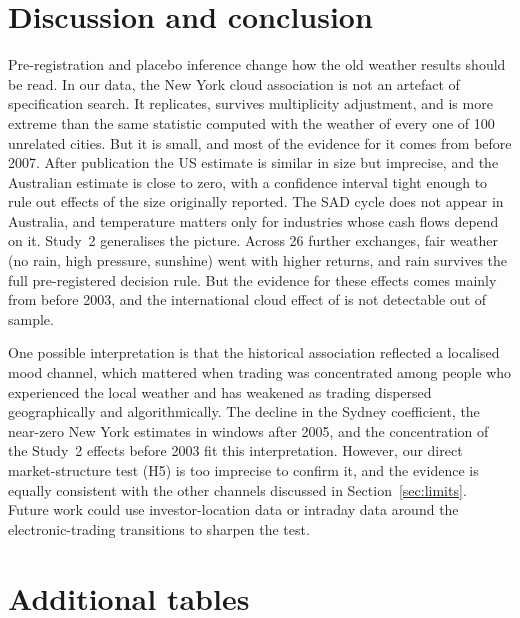 \documentclass[11pt]{article}
\begin{document}
\section{Discussion and conclusion}

Pre-registration and placebo inference change how the old weather results should be read. In our
data, the New York cloud association is not an artefact of specification search. It replicates, survives
multiplicity adjustment, and is more extreme than the same statistic computed with the weather of
every one of 100 unrelated cities. But it is small, and most of the evidence for it comes from
before 2007. After publication the US estimate is similar in size but imprecise, and the
Australian estimate is close to zero, with a confidence interval tight enough to rule out effects
of the size originally reported. The SAD cycle does not appear in Australia, and temperature
matters only for industries whose cash flows depend on it. Study~2 generalises the picture. Across
26 further exchanges, fair weather (no rain, high pressure, sunshine) went with higher returns,
and rain survives the full pre-registered decision rule. But the evidence for these effects comes
mainly from before 2003, and the international cloud effect of \citet{hirshleifer2003} is not
detectable out of sample.

One possible interpretation is that the historical association reflected a localised mood channel,
which mattered when trading was concentrated among people who experienced the local weather and
has weakened as trading dispersed geographically and algorithmically. The decline in the Sydney
coefficient, the near-zero New York estimates in windows after 2005, and the concentration of the
Study~2 effects before 2003 fit this interpretation. However, our direct market-structure test (H5)
is too imprecise to confirm it, and the evidence is equally consistent with the other channels
discussed in Section~\ref{sec:limits}. Future work could use investor-location data
\citep{goetzmann2015} or intraday data around the electronic-trading transitions to sharpen the
test.



\clearpage
\appendix
\section{Additional tables}





\end{document}
